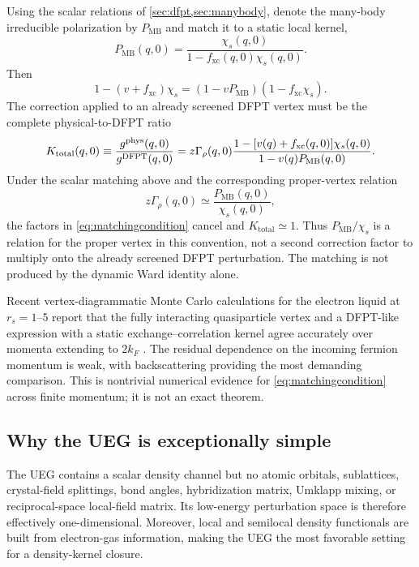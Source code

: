 Using the scalar relations of \cref{sec:dfpt,sec:manybody}, denote the
many-body irreducible polarization by $P_{\mathrm{MB}}$ and match it to a static
local kernel,
\begin{equation}
  P_{\mathrm{MB}}(q,0)=
  \frac{\chi_s(q,0)}{1-f_{\mathrm{xc}}(q,0)\chi_s(q,0)}.
  \label{eq:pfromfxc}
\end{equation}
Then
\begin{equation}
  1-(v+f_{\mathrm{xc}})\chi_s
  = (1-vP_{\mathrm{MB}})(1-f_{\mathrm{xc}}\chi_s).
  \label{eq:factorization}
\end{equation}
The correction applied to an already screened DFPT vertex must be the complete
physical-to-DFPT ratio
\begin{equation}
  K_{\mathrm{total}}(q,0)
  \equiv \frac{g^{\mathrm{phys}}(q,0)}{g^{\mathrm{DFPT}}(q,0)}
  =z\Gamma_\rho(q,0)
   \frac{1-[v(q)+f_{\mathrm{xc}}(q,0)]\chi_s(q,0)}
        {1-v(q)P_{\mathrm{MB}}(q,0)}.
  \label{eq:matchingcondition}
\end{equation}
Under the scalar matching above and the corresponding proper-vertex relation
\begin{equation}
  z\Gamma_\rho(q,0)\simeq
  \frac{P_{\mathrm{MB}}(q,0)}{\chi_s(q,0)},
  \label{eq:propervertexmatching}
\end{equation}
the factors in \cref{eq:matchingcondition} cancel and
$K_{\mathrm{total}}\simeq1$.  Thus $P_{\mathrm{MB}}/\chi_s$ is a relation for
the proper vertex in this convention, not a second correction factor to multiply
onto the already screened DFPT perturbation.  The matching is not produced by
the dynamic Ward identity alone.

Recent vertex-diagrammatic Monte Carlo calculations for the electron liquid at
$r_s=1$--$5$ report that the fully interacting quasiparticle vertex and a
DFPT-like expression with a static exchange--correlation kernel agree accurately
over momenta extending to $2k_F$ \citep{Cai2025}.  The residual dependence on the
incoming fermion momentum is weak, with backscattering providing the most
demanding comparison.  This is nontrivial numerical evidence for
\cref{eq:matchingcondition} across finite momentum; it is not an exact theorem.

\subsection{Why the UEG is exceptionally simple}

The UEG contains a scalar density channel but no atomic orbitals, sublattices,
crystal-field splittings, bond angles, hybridization matrix, Umklapp mixing, or
reciprocal-space local-field matrix.  Its low-energy perturbation space is
therefore effectively one-dimensional.  Moreover, local and semilocal density
functionals are built from electron-gas information, making the UEG the most
favorable setting for a density-kernel closure.

